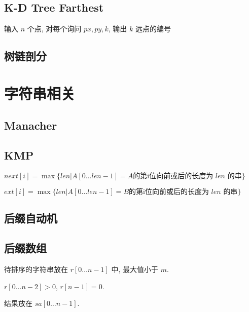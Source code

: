 \documentclass[landscape, twocolumn, 8pt, a4paper, twoside]{extarticle}
\begin{document}
  \subsection{K-D Tree Farthest}
    输入 $n$ 个点, 对每个询问 $px, py, k$, 输出 $k$ 远点的编号
    

  \subsection{树链剖分}
    

\section{字符串相关}
  \subsection{Manacher}
    

  \subsection{KMP}
    $next[i] = \max\{len | A[0 \ldots len - 1] = A \textrm{的第i位向前或后的长度为 $len$ 的串} \}$

    $ext[i] = \max\{len | A[0 \ldots len - 1] = B \textrm{的第i位向前或后的长度为 $len$ 的串} \}$
    

%    

  \subsection{后缀自动机}
    

  \subsection{后缀数组}
    待排序的字符串放在 $r[0 \ldots n - 1]$ 中, 最大值小于 $m$.
    
    $r[0 \ldots n - 2] > 0$, $r[n - 1] = 0$.
    
    结果放在 $sa[0 \ldots n - 1]$.
    
  
\end{document}
